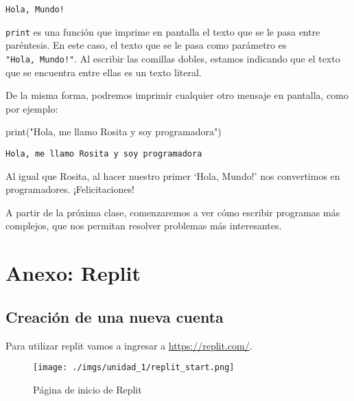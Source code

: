 \documentclass[
  letterpaper,
  DIV=11,
  numbers=noendperiod]{scrreprt}
\newenvironment{Shaded}{\begin{snugshade}}{\end{snugshade}}
\newcommand{\BuiltInTok}[1]{\textcolor[rgb]{0.00,0.23,0.31}{#1}}
\newcommand{\NormalTok}[1]{\textcolor[rgb]{0.00,0.23,0.31}{#1}}
\newcommand{\StringTok}[1]{\textcolor[rgb]{0.13,0.47,0.30}{#1}}
\begin{document}
\begin{verbatim}
Hola, Mundo!
\end{verbatim}

\texttt{print} es una función que imprime en pantalla el texto que se le
pasa entre paréntesis. En este caso, el texto que se le pasa como
parámetro es \texttt{"Hola,\ Mundo!"}. Al escribir las comillas dobles,
estamos indicando que el texto que se encuentra entre ellas es un texto
literal.

De la misma forma, podremos imprimir cualquier otro mensaje en pantalla,
como por ejemplo:

\begin{Shaded}
\begin{Highlighting}[]
\BuiltInTok{print}\NormalTok{(}\StringTok{"Hola, me llamo Rosita y soy programadora"}\NormalTok{)}
\end{Highlighting}
\end{Shaded}

\begin{verbatim}
Hola, me llamo Rosita y soy programadora
\end{verbatim}

Al igual que Rosita, al hacer nuestro primer `Hola, Mundo!' nos
convertimos en programadores. ¡Felicitaciones!

A partir de la próxima clase, comenzaremos a ver cómo escribir programas
más complejos, que nos permitan resolver problemas más interesantes.

\section{Anexo: Replit}\label{anexo-replit}

\subsection{Creación de una nueva
cuenta}\label{creaciuxf3n-de-una-nueva-cuenta}

Para utilizar replit vamos a ingresar a \url{https://replit.com/}.\\

\begin{figure}[H]

{\centering \texttt{[image: ./imgs/unidad\_1/replit\_start.png]}

}

\caption{Página de inicio de Replit}

\end{figure}%
\end{document}
